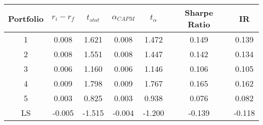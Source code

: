\begin{tabular}{ccccccc}
\toprule
Portfolio & $r_i - r_f$ & $t_{stat}$ & $\alpha_{CAPM}$ & $t_{\alpha}$ & Sharpe Ratio & IR \\
\midrule
1 & 0.008 & 1.621 & 0.008 & 1.472 & 0.149 & 0.139 \\
2 & 0.008 & 1.551 & 0.008 & 1.447 & 0.142 & 0.134 \\
3 & 0.006 & 1.160 & 0.006 & 1.146 & 0.106 & 0.105 \\
4 & 0.009 & 1.798 & 0.009 & 1.767 & 0.165 & 0.162 \\
5 & 0.003 & 0.825 & 0.003 & 0.938 & 0.076 & 0.082 \\
LS & -0.005 & -1.515 & -0.004 & -1.200 & -0.139 & -0.118 \\
\bottomrule
\end{tabular}

